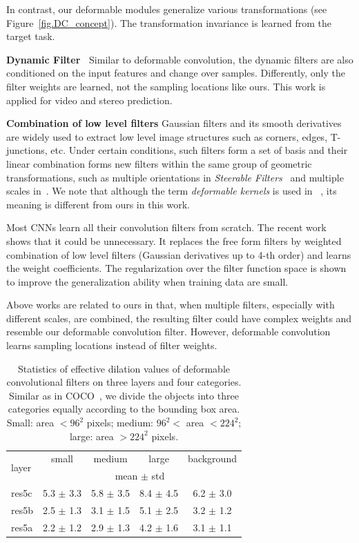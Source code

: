 \documentclass[10pt,twocolumn,letterpaper]{article}
\begin{document}
In contrast, our deformable modules generalize various transformations (see Figure~\ref{fig.DC_concept}). The transformation invariance is learned from the target task.

\textbf{Dynamic Filter~\cite{bert2016dynamic}} Similar to deformable convolution, the dynamic filters are also conditioned on the input features and change over samples. Differently, only the filter weights are learned, not the sampling locations like ours. This work is applied for video and stereo prediction.

\textbf{Combination of low level filters} Gaussian filters and its smooth derivatives~\cite{Koenderink87} are widely used to extract low level image structures such as corners, edges, T-junctions, etc. Under certain conditions, such filters form a set of basis and their linear combination forms new filters within the same group of geometric transformations, such as multiple orientations in \emph{Steerable Filters}~\cite{freeman1991steerable} and multiple scales in~\cite{perona1995deformable}. We note that although the term \emph{deformable kernels} is used in ~\cite{perona1995deformable}, its meaning is different from ours in this work.

Most CNNs learn all their convolution filters from scratch. The recent work~\cite{jacobsen2016structured} shows that it could be unnecessary. It replaces the free form filters by weighted combination of low level filters (Gaussian derivatives up to 4-th order) and learns the weight coefficients. The regularization over the filter function space is shown to improve the generalization ability when training data are small.

Above works are related to ours in that, when multiple filters, especially with different scales, are combined, the resulting filter could have complex weights and resemble our deformable convolution filter. However, deformable convolution learns sampling locations instead of filter weights.

\setlength{\tabcolsep}{4pt}
\renewcommand{\arraystretch}{1.2}
\begin{table}[t]
\centering
\small
\begin{tabular}{l|c|c|c|c}
\hline
\multirow{2}{*}{layer} &  small &  medium & large &  background \\ 
\cline{2-5}
& \multicolumn{4}{c}{ mean $\pm$  std} \\
\hline\hline
res5c & 5.3 $\pm$ 3.3 & 5.8 $\pm$ 3.5 & 8.4 $\pm$ 4.5 & 6.2 $\pm$ 3.0 \\
res5b & 2.5 $\pm$ 1.3 & 3.1 $\pm$ 1.5 & 5.1 $\pm$ 2.5 & 3.2 $\pm$ 1.2 \\
res5a & 2.2 $\pm$ 1.2 & 2.9 $\pm$ 1.3 & 4.2 $\pm$ 1.6 & 3.1 $\pm$ 1.1 \\
\hline
\end{tabular}
\caption{Statistics of effective dilation values of deformable convolutional filters on three layers and four categories. Similar as in COCO~\cite{lin2014coco}, we divide the objects into three categories equally according to the bounding box area. Small: area $< 96^2$ pixels; medium: $96^2 < $ area $ < 224^2$; large: area $>224^2$ pixels.}
\label{table.deformable_convolution_stat}
\end{table}
\end{document}
